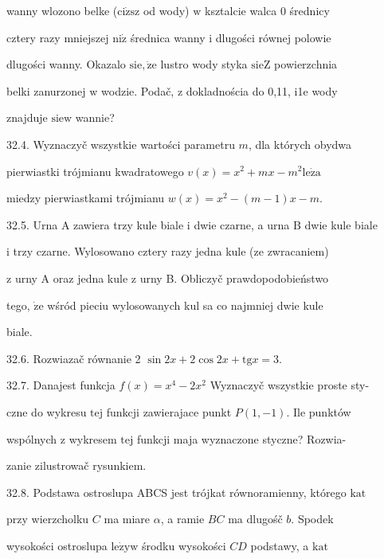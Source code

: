 \documentclass[a4paper,12pt]{article}
\begin{document}
wanny wlozono belke ($\mathrm{c}\mathrm{i}\dot{\mathrm{z}}\mathrm{s}\mathrm{z}$ od wody) $\mathrm{w}$ ksztalcie walca $0$ średnicy

cztery razy mniejszej $\mathrm{n}\mathrm{i}\dot{\mathrm{z}}$ średnica wanny $\mathrm{i}$ dlugości równej polowie

dlugości wanny. Okazalo $\mathrm{s}\mathrm{i}\mathrm{e}, \dot{\mathrm{z}}\mathrm{e}$ lustro wody styka $\mathrm{s}\mathrm{i}\mathrm{e}\mathrm{Z}$ powierzchnia

belki zanurzonej $\mathrm{w}$ wodzie. Podač, $\mathrm{z}$ dokladnościa do 0,11, i1e wody

znajduje $\mathrm{s}\mathrm{i}\mathrm{e}\mathrm{w}$ wannie?

32.4. Wyznaczyč wszystkie wartości parametru $m$, dla których obydwa

pierwiastki trójmianu kwadratowego $v(x) = x^{2}+mx-m^{2} \mathrm{l}\mathrm{e}\dot{\mathrm{z}}\mathrm{a}$

miedzy pierwiastkami trójmianu $w(x)=x^{2}-(m-1)x-m.$

32.5. Urna A zawiera trzy kule biale $\mathrm{i}$ dwie czarne, a urna $\mathrm{B}$ dwie kule biale

$\mathrm{i}$ trzy czarne. Wylosowano cztery razy jedna kule (ze zwracaniem)

$\mathrm{z}$ urny A oraz jedna kule $\mathrm{z}$ urny B. Obliczyč prawdopodobieństwo

tego, $\dot{\mathrm{z}}\mathrm{e}$ wśród pieciu wylosowanych kul sa co najmniej dwie kule

biale.

32.6. Rozwiazač równanie 2 $\sin 2x+2\cos 2x+\mathrm{t}\mathrm{g}x=3.$

32.7. Danajest funkcja $f(x)=x^{4}-2x^{2}$ Wyznaczyč wszystkie proste sty-

czne do wykresu $\mathrm{t}\mathrm{e}\mathrm{j}$ funkcji zawierajace punkt $P(1,-1)$. Ile punktów

wspólnych $\mathrm{z}$ wykresem $\mathrm{t}\mathrm{e}\mathrm{j}$ funkcji maja wyznaczone styczne? Rozwia-

zanie zilustrowač rysunkiem.

32.8. Podstawa ostroslupa ABCS jest trójkat równoramienny, którego $\mathrm{k}\mathrm{a}\mathrm{t}$

przy wierzcholku $C$ ma miare $\alpha$, a ramie $BC$ ma dlugośč $b$. Spodek

wysokości ostroslupa $\mathrm{l}\mathrm{e}\dot{\mathrm{z}}\mathrm{y}\mathrm{w}$ środku wysokości $CD$ podstawy, a $\mathrm{k}\mathrm{a}\mathrm{t}$
\end{document}
